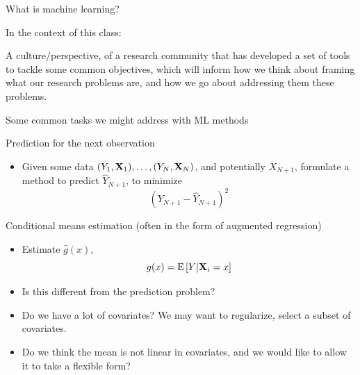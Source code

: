 \documentclass[xcolor={dvipsnames}, handout]{beamer}
\begin{document}



\begin{frame}{What is machine learning?}

In the context of this class:\pause

\begin{wideitemize}
\item A culture/perspective, \pause of a research community that has developed a set of tools to tackle some common objectives, \pause which will inform how we think about framing what our research problems are, and how we go about addressing them these problems. 
\end{wideitemize}

\end{frame}





\begin{frame}{Some common tasks we might address with ML methods}
\pause
\begin{wideitemize}
\item Prediction for the next observation \pause
\begin{itemize}
\item Given some data $(Y_1, \mathbf{X}_1), \dots, (Y_N, \mathbf{X}_N)$, and potentially $X_{N+1}$, formulate a method to predict $\hat{Y}_{N+1}$, to minimize
\[
\left(Y_{N+1} - \hat{Y}_{N+1}\right)^2
\]
\end{itemize}
\pause
\item Conditional means estimation \pause (often in the form of augmented regression)\pause
\begin{itemize}
\item Estimate $\hat g(x)$, 
\[
g(x) = {\textrm E}\,[Y | \mathbf{X}_i = x]
\]\pause
\item Is this different from the prediction problem? \pause
\item Do we have a lot of covariates? We may want to regularize, select a subset of covariates. \pause
\item Do we think the mean is not linear in covariates, and we would like to allow it to take a flexible form? 
\end{itemize}
\end{wideitemize}

\end{frame}
\end{document}
